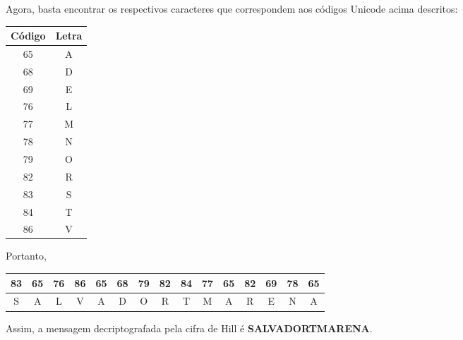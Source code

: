 \documentclass[oneside,a4paper,12pt]{article}
\theoremstyle{definition}
\theoremstyle{plain}
\theoremstyle{solu}
\theoremstyle{dotlessP}
\begin{document}
Agora, basta encontrar os respectivos caracteres que correspondem aos códigos Unicode acima descritos:
\begin{center}
    \begin{tabular}{|c|c|}
    \hline
    Código & Letra \\ \hline
    65     &  A \\ \hline
    68     &  D \\ \hline
    69     &  E \\ \hline
    76     &  L \\ \hline
    77     &  M \\ \hline
    78     &  N \\ \hline
    79     &  O \\ \hline
    82     &  R \\ \hline
    83     &  S \\ \hline
    84     &  T \\ \hline
    86     &  V \\ \hline
    \end{tabular}
\end{center}

Portanto, 
\begin{center}
    \begin{tabular}{|c|c|c|c|c|c|c|c|c|c|c|c|c|c|c|}
    \hline
      83 & 65 & 76 & 86 & 65 & 68 & 79 & 82 & 84 & 77 & 65 & 82 & 69 & 78 & 65 \\ \hline
      S & A & L & V & A & D & O & R & T & M & A & R & E & N & A \\ \hline
    \end{tabular}
\end{center}

Assim, a mensagem decriptografada pela cifra de Hill é \newline 
\newline \centering \textbf{SALVADORTMARENA}.
\end{document}
